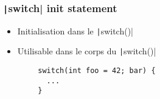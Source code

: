 \documentclass[C++.tex]{subfiles}
\begin{document}
\begin{frame}[fragile]
	\frametitle{\texttt|switch| init statement}
	\begin{itemize}
		\item Initialisation dans le \texttt|switch()|
		\item Utilisable dans le corps du \texttt|switch()|
	\end{itemize}

	\begin{verbatim}
		switch(int foo = 42; bar) {
		  ...
		}
	\end{verbatim}


\end{frame}
\end{document}
